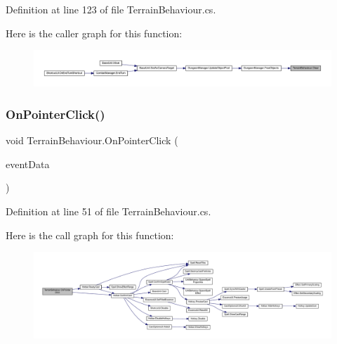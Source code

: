 Definition at line 123 of file Terrain\+Behaviour.\+cs.

Here is the caller graph for this function\+:
\nopagebreak
\begin{figure}[H]
\begin{center}
\leavevmode
\includegraphics[width=350pt]{class_terrain_behaviour_a23ffdd00ac2a41293dff38496a09663d_icgraph}
\end{center}
\end{figure}
\mbox{\label{class_terrain_behaviour_a81acf1d578876b7a0870fdb0880c52a9}} 
\subsubsection{\texorpdfstring{OnPointerClick()}{OnPointerClick()}}
{\footnotesize\ttfamily void Terrain\+Behaviour.\+On\+Pointer\+Click (\begin{DoxyParamCaption}\item[{Pointer\+Event\+Data}]{event\+Data }\end{DoxyParamCaption})}



Definition at line 51 of file Terrain\+Behaviour.\+cs.

Here is the call graph for this function\+:
\nopagebreak
\begin{figure}[H]
\begin{center}
\leavevmode
\includegraphics[width=350pt]{class_terrain_behaviour_a81acf1d578876b7a0870fdb0880c52a9_cgraph}
\end{center}
\end{figure}
\mbox{\label{class_terrain_behaviour_a97b6323eafb1c26361878bb1d37f4556}} 
